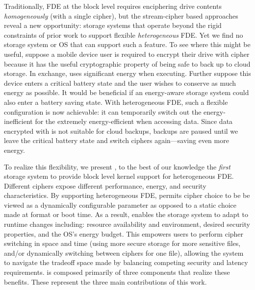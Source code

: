 Traditionally, FDE at the block level requires enciphering drive
contents {\em homogeneously} (with a single cipher), but the
stream-cipher based approaches reveal a new opportunity: storage
systems that operate beyond the rigid constraints of prior work to
support flexible {\em heterogeneous} FDE. Yet we find no storage
system or OS that can support such a feature. To see where this might
be useful, suppose a mobile device user is required to encrypt their
drive with cipher \encA because it has the useful cryptographic
property of being safe to back up to cloud storage. In exchange, \encA
uses significant energy when executing. Further suppose this device
enters a critical battery state and the user wishes to conserve as
much energy as possible. It would be beneficial if an energy-aware
storage system could also enter a battery saving state.  With
heterogeneous FDE, such a flexible configuration is now achievable: it
can temporarily switch out the energy-inefficient \encA for the
extremely energy-efficient \encB when accessing data. Since data
encrypted with \encB is not suitable for cloud backups, backups are
paused until we leave the critical battery state and switch ciphers
again---saving even more energy.


To realize this flexibility, we present \sys, to the best of our
knowledge the {\em first} storage system to provide block level kernel
support for heterogeneous FDE. Different ciphers expose different
performance, energy, and security  characteristics. By supporting
heterogeneous FDE, \sys permits cipher choice to be be viewed as a
dynamically configurable parameter as opposed to a static choice made
at format or boot time. As a result, \sys enables the storage system
to adapt to runtime changes including: resource
availability and environment, desired security properties, and the
OS's energy budget. This empowers users to perform cipher switching in
space and time (\eg using more secure storage for more sensitive
files, and/or dynamically switching between ciphers for one file),
allowing the system to navigate the tradeoff space made by balancing
competing security and latency requirements.  \sys is composed
primarily of three components that realize these benefits. These
represent the three main contributions of this work.

